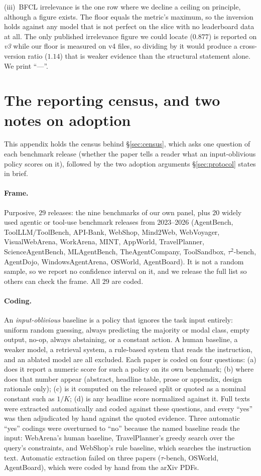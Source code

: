\documentclass{article}
\theoremstyle{plain}
\theoremstyle{definition}
\begin{document}
(iii)~BFCL irrelevance is the one row where we decline a ceiling on principle, although a figure exists. The floor equals the metric's maximum, so the inversion holds against any model that is not perfect on the slice with no leaderboard data at all. The only published irrelevance figure we could locate ($0.877$) is reported on \emph{v3} while our floor is measured on v4 files, so dividing by it would produce a cross-version ratio ($1.14$) that is weaker evidence than the structural statement alone. We print ``---''.

\section{The reporting census, and two notes on adoption}
\label{app:census}

This appendix holds the census behind \S\ref{sec:census}, which asks one question of each benchmark release (whether the paper tells a reader what an input-oblivious policy scores on it), followed by the two adoption arguments \S\ref{sec:protocol} states in brief.

\paragraph{Frame.} Purposive, $29$ releases: the nine benchmarks of our own panel, plus $20$ widely used agentic or tool-use benchmark releases from 2023--2026 (AgentBench, ToolLLM/ToolBench, API-Bank, WebShop, Mind2Web, WebVoyager, VisualWebArena, WorkArena, MINT, AppWorld, TravelPlanner, ScienceAgentBench, MLAgentBench, TheAgentCompany, ToolSandbox, $\tau^2$-bench, AgentDojo, WindowsAgentArena, OSWorld, AgentBoard). It is not a random sample, so we report no confidence interval on it, and we release the full list so others can check the frame. All $29$ are coded.

\paragraph{Coding.} An \emph{input-oblivious} baseline is a policy that ignores the task input entirely: uniform random guessing, always predicting the majority or modal class, empty output, no-op, always abstaining, or a constant action. A human baseline, a weaker model, a retrieval system, a rule-based system that reads the instruction, and an ablated model are all excluded. Each paper is coded on four questions: (a) does it report a numeric score for such a policy on its own benchmark; (b) where does that number appear (abstract, headline table, prose or appendix, design rationale only); (c) is it computed on the released split or quoted as a nominal constant such as $1/K$; (d) is any headline score normalized against it. Full texts were extracted automatically and coded against these questions, and every ``yes'' was then adjudicated by hand against the quoted evidence. Three automatic ``yes'' codings were overturned to ``no'' because the named baseline reads the input: WebArena's human baseline, TravelPlanner's greedy search over the query's constraints, and WebShop's rule baseline, which searches the instruction text. Automatic extraction failed on three papers ($\tau$-bench, OSWorld, AgentBoard), which were coded by hand from the arXiv PDFs.
\end{document}
